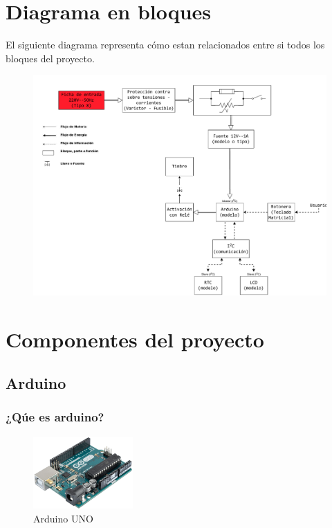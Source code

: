 \documentclass{article}
\begin{document}
\section{Diagrama en bloques}
El siguiente diagrama representa cómo estan relacionados entre si todos los bloques
del proyecto.
	\begin{figure}[H]
		\centering
		\includegraphics[width=\textwidth,keepaspectratio=true] 
		{diagrama_bloques.pdf}
	\end{figure} 

\section{Componentes del proyecto}
	\subsection{Arduino}
		\subsubsection{¿Qúe es arduino?}
		\begin{figure}
			\centering
			\includegraphics[width= 1.5in, keepaspectratio]{arduino.png}
			\caption{Arduino UNO}	
		\end{figure}
\end{document}
